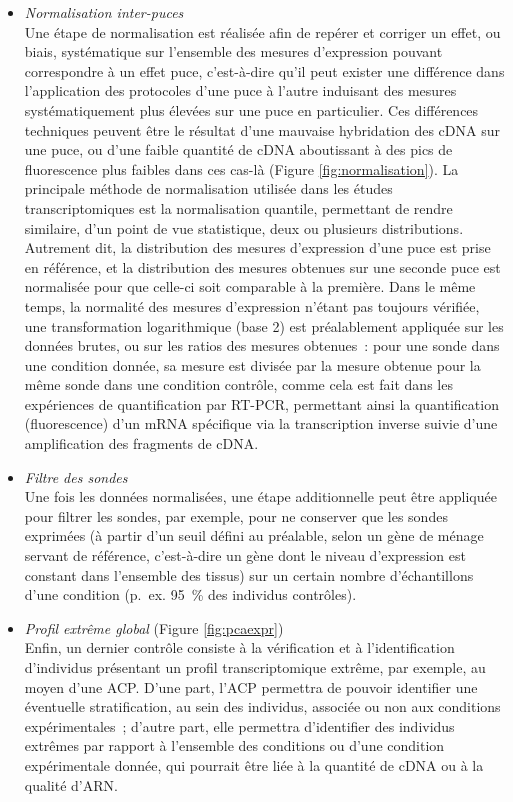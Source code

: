 \documentclass[11pt,a4paper,notrimn]{krantz}
\theoremstyle{definition}
\theoremstyle{definition}
\theoremstyle{remark}
\begin{document}
\begin{itemize}
\item
  \emph{Normalisation inter-puces}\\
  Une étape de normalisation est réalisée afin de repérer et corriger un
  effet, ou biais, systématique sur l'ensemble des mesures d'expression
  pouvant correspondre à un effet puce, c'est-à-dire qu'il peut exister
  une différence dans l'application des protocoles d'une puce à l'autre
  induisant des mesures systématiquement plus élevées sur une puce en
  particulier. Ces différences techniques peuvent être le résultat d'une
  mauvaise hybridation des cDNA sur une puce, ou d'une faible quantité
  de cDNA aboutissant à des pics de fluorescence plus faibles dans ces
  cas-là (Figure \ref{fig:normalisation}). La principale méthode de
  normalisation utilisée dans les études transcriptomiques est la
  normalisation quantile, permettant de rendre similaire, d'un point de
  vue statistique, deux ou plusieurs distributions. Autrement dit, la
  distribution des mesures d'expression d'une puce est prise en
  référence, et la distribution des mesures obtenues sur une seconde
  puce est normalisée pour que celle-ci soit comparable à la première.
  Dans le même temps, la normalité des mesures d'expression n'étant pas
  toujours vérifiée, une transformation logarithmique (base 2) est
  préalablement appliquée sur les données brutes, ou sur les ratios des
  mesures obtenues~: pour une sonde dans une condition donnée, sa mesure
  est divisée par la mesure obtenue pour la même sonde dans une
  condition contrôle, comme cela est fait dans les expériences de
  quantification par RT-PCR, permettant ainsi la quantification
  (fluorescence) d'un mRNA spécifique via la transcription inverse
  suivie d'une amplification des fragments de cDNA.
\item
  \emph{Filtre des sondes}\\
  Une fois les données normalisées, une étape additionnelle peut être
  appliquée pour filtrer les sondes, par exemple, pour ne conserver que
  les sondes exprimées (à partir d'un seuil défini au préalable, selon
  un gène de ménage servant de référence, c'est-à-dire un gène dont le
  niveau d'expression est constant dans l'ensemble des tissus) sur un
  certain nombre d'échantillons d'une condition (p.~ex. 95~\% des
  individus contrôles).
\item
  \emph{Profil extrême global} (Figure \ref{fig:pcaexpr})\\
  Enfin, un dernier contrôle consiste à la vérification et à
  l'identification d'individus présentant un profil transcriptomique
  extrême, par exemple, au moyen d'une ACP. D'une part, l'ACP permettra
  de pouvoir identifier une éventuelle stratification, au sein des
  individus, associée ou non aux conditions expérimentales~; d'autre
  part, elle permettra d'identifier des individus extrêmes par rapport à
  l'ensemble des conditions ou d'une condition expérimentale donnée, qui
  pourrait être liée à la quantité de cDNA ou à la qualité d'ARN.
\end{itemize}
\end{document}
